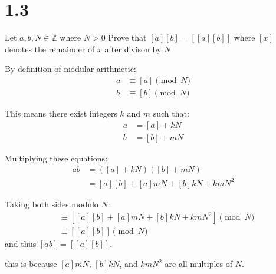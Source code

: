 \documentclass{article}
\begin{document}
\section{1.3}
Let $a,b, N \in \mathbb{Z}$ where $N > 0$ Prove that $[a][b] = [[a][b]]$ where $[x]$ denotes the remainder of $x$ after divison by $N$ 
\begin{solution}
    By definition of modular arithmetic:
\begin{align*}
a &\equiv [a] \pmod{N} \\
b &\equiv [b] \pmod{N}
\end{align*}

This means there exist integers $k$ and $m$ such that:
\begin{align*}
a &= [a] + kN \\
b &= [b] + mN
\end{align*}

Multiplying these equations:
\begin{align*}
ab &= ([a] + kN)([b] + mN) \\
   &= [a][b] + [a]mN + [b]kN + kmN^2
\end{align*}

Taking both sides modulo $N$:
\begin{align*}
[ab] &\equiv [[a][b] + [a]mN + [b]kN + kmN^2] \pmod{N} \\
     &\equiv [[a][b]] \pmod{N}
\end{align*}
and thus $[ab] = [[a][b]]$.

this is because $[a]mN$, $[b]kN$, and $kmN^2$ are all multiples of $N$.

\end{solution}
\end{document}
